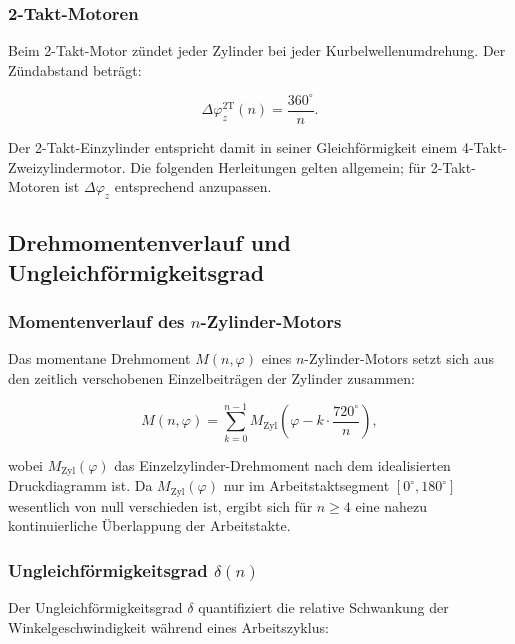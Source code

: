 ﻿\documentclass[a4paper,12pt]{article}
\begin{document}
\subsubsection*{2-Takt-Motoren}

Beim 2-Takt-Motor zündet jeder Zylinder bei jeder Kurbelwellenumdrehung.
Der Zündabstand beträgt:

\begin{equation}
  \Delta\varphi_z^\text{2T}(n) = \frac{360^\circ}{n}.
  \label{eq:zuendabstand_2t}
\end{equation}

Der 2-Takt-Einzylinder entspricht damit in seiner Gleichförmigkeit einem
4-Takt-Zweizylindermotor. Die folgenden Herleitungen gelten allgemein;
für 2-Takt-Motoren ist $\Delta\varphi_z$ entsprechend anzupassen.

\subsection{Drehmomentenverlauf und Ungleichförmigkeitsgrad}

\subsubsection*{Momentenverlauf des $n$-Zylinder-Motors}

Das momentane Drehmoment $M(n, \varphi)$ eines $n$-Zylinder-Motors setzt
sich aus den zeitlich verschobenen Einzelbeiträgen der Zylinder zusammen:

\begin{equation}
  M(n, \varphi) = \sum_{k=0}^{n-1} M_\text{Zyl}\!\left(\varphi
    - k \cdot \frac{720^\circ}{n}\right),
  \label{eq:M_nzyl}
\end{equation}

\noindent
wobei $M_\text{Zyl}(\varphi)$ das Einzelzylinder-Drehmoment nach dem
idealisierten Druckdiagramm ist. Da $M_\text{Zyl}(\varphi)$ nur im
Arbeitstaktsegment $[0^\circ, 180^\circ]$ wesentlich von null verschieden
ist, ergibt sich für $n \geq 4$ eine nahezu kontinuierliche Überlappung
der Arbeitstakte.

\subsubsection*{Ungleichförmigkeitsgrad $\delta(n)$}

Der Ungleichförmigkeitsgrad $\delta$ quantifiziert die relative Schwankung
der Winkelgeschwindigkeit während eines Arbeitszyklus:
\end{document}
